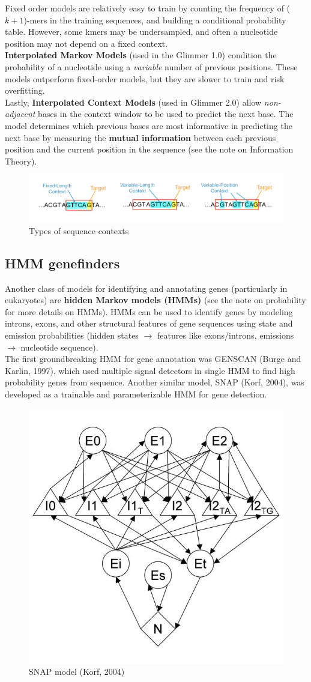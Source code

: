 \documentclass[12pt]{article}
\begin{document}
Fixed order models are relatively easy to train by counting the frequency of ($k+1$)-mers in the training sequences, and building a conditional probability table. However, some kmers may be undersampled, and often a nucleotide position may not depend on a fixed context.\\[10pt]
\textbf{Interpolated Markov Models} (used in the Glimmer 1.0) condition the probability of a nucleotide using a \textit{variable} number of previous positions. These models outperform fixed-order models, but they are slower to train and risk overfitting.\\[10pt]
Lastly, \textbf{Interpolated Context Models} (used in Glimmer 2.0) allow \textit{non-adjacent} bases in the context window to be used to predict the next base. The model determines which previous bases are most informative in predicting the next base by measuring the \textbf{mutual information} between each previous position and the current position in the sequence (see the note on Information Theory).

\begin{figure}[h]
    \centering
    \includegraphics[width=\linewidth]{hmm_context.png}
    \caption{Types of sequence contexts}
    \label{fig:my_label}
\end{figure}

\subsection{HMM genefinders}
Another class of models for identifying and annotating genes (particularly in eukaryotes) are \textbf{hidden Markov models (HMMs)} (see the note on probability for more details on HMMs). HMMs can be used to identify genes by modeling introns, exons, and other structural features of gene sequences using state and emission probabilities (hidden states $\rightarrow$ features like exons/introns, emissions $\rightarrow$ nucleotide sequence).\\[10pt]
The first groundbreaking HMM for gene annotation was GENSCAN (Burge and Karlin, 1997), which used multiple signal detectors in single HMM to find high probability genes from sequence. Another similar model, SNAP (Korf, 2004), was developed as a trainable and parameterizable HMM for gene detection.
\begin{figure}[h]
    \centering
    \includegraphics[width=.4\linewidth]{snap.jpg}
    \caption{SNAP model (Korf, 2004)}
    \label{fig:snap}
\end{figure}
\end{document}
